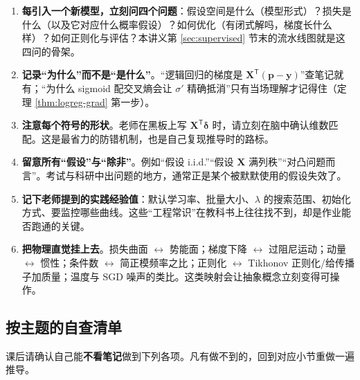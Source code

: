 \documentclass[UTF8,a4paper,11pt]{ctexart}
\theoremstyle{definition}
\theoremstyle{plain}
\theoremstyle{remark}
\newcommand{\T}{^{\mathsf{T}}}
\begin{document}
\begin{enumerate}[label=\arabic*.]
  \item \textbf{每引入一个新模型，立刻问四个问题}：假设空间是什么（模型形式）？损失是什么（以及它对应什么概率假设）？如何优化（有闭式解吗，梯度长什么样）？如何正则化与评估？本讲义第 \ref{sec:supervised} 节末的流水线图就是这四问的骨架。
  \item \textbf{记录“为什么”而不是“是什么”}。“逻辑回归的梯度是 $\bm{X}\T(\bm{p}-\bm{y})$”查笔记就有；“为什么 sigmoid 配交叉熵会让 $\sigma'$ 精确抵消”只有当场理解才记得住（定理 \ref{thm:logreg-grad} 第一步）。
  \item \textbf{注意每个符号的形状}。老师在黑板上写 $\bm{X}\T\bm{\delta}$ 时，请立刻在脑中确认维数匹配。这是最省力的防错机制，也是自己复现推导时的路标。
  \item \textbf{留意所有“假设”与“除非”}。例如“假设 i.i.d.”“假设 $\bm{X}$ 满列秩”“对凸问题而言”。考试与科研中出问题的地方，通常正是某个被默默使用的假设失效了。
  \item \textbf{记下老师提到的实践经验值}：默认学习率、批量大小、$\lambda$ 的搜索范围、初始化方式、要监控哪些曲线。这些“工程常识”在教科书上往往找不到，却是作业能否跑通的关键。
  \item \textbf{把物理直觉挂上去}。损失曲面 $\leftrightarrow$ 势能面；梯度下降 $\leftrightarrow$ 过阻尼运动；动量 $\leftrightarrow$ 惯性；条件数 $\leftrightarrow$ 简正模频率之比；正则化 $\leftrightarrow$ Tikhonov 正则化/给传播子加质量；温度与 SGD 噪声的类比。这类映射会让抽象概念立刻变得可操作。
\end{enumerate}

\subsection{按主题的自查清单}

课后请确认自己能\textbf{不看笔记}做到下列各项。凡有做不到的，回到对应小节重做一遍推导。
\end{document}
